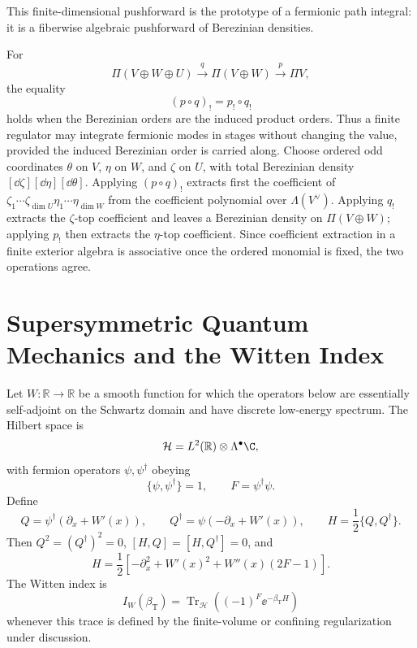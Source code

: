 This finite-dimensional pushforward is the prototype of a fermionic path
integral: it is a fiberwise algebraic pushforward of Berezinian densities.

For
\[
  \Pi(V\oplus W\oplus U)
  \xrightarrow{q}
  \Pi(V\oplus W)
  \xrightarrow{p}
  \Pi V ,
\]
the equality
\[
  (p\circ q)_!=p_!\circ q_!
\]
holds when the Berezinian orders are the induced product orders.  Thus a
finite regulator may integrate fermionic modes in stages without changing the
value, provided the induced Berezinian order is carried along.
Choose ordered odd coordinates \(\theta\) on \(V\), \(\eta\) on \(W\), and
\(\zeta\) on \(U\), with total Berezinian density
\([\dd\zeta][\dd\eta][\dd\theta]\).  Applying \((p\circ q)_!\) extracts first
the coefficient of \(\zeta_1\cdots\zeta_{\dim U}\eta_1\cdots\eta_{\dim W}\)
from the coefficient polynomial over \(\Lambda(V^\vee)\).  Applying \(q_!\)
extracts the \(\zeta\)-top coefficient and leaves a Berezinian density on
\(\Pi(V\oplus W)\); applying \(p_!\) then extracts the \(\eta\)-top
coefficient.  Since coefficient extraction in a finite exterior algebra is
associative once the ordered monomial is fixed, the two operations agree.

\section{Supersymmetric Quantum Mechanics and the Witten Index}

\begin{definition}
\label{def:susy-qm-witten-index-datum}
Let \(W:\mathbb R\to\mathbb R\) be a smooth function for which the operators
below are essentially self-adjoint on the Schwartz domain and have discrete
low-energy spectrum.  The Hilbert space is
\[
  \mathcal H=L^2(\mathbb R)\otimes\Lambda^\bullet\C,
\]
with fermion operators \(\psi,\psi^\dagger\) obeying
\[
  \{\psi,\psi^\dagger\}=1,\qquad
  F=\psi^\dagger\psi .
\]
Define
\[
  Q=\psi^\dagger(\partial_x+W'(x)),
  \qquad
  Q^\dagger=\psi(-\partial_x+W'(x)),
  \qquad
  H=\frac12\{Q,Q^\dagger\}.
\]
Then \(Q^2=(Q^\dagger)^2=0\), \([H,Q]=[H,Q^\dagger]=0\), and
\begin{equation}
  H
  =
  \frac12
  \left[
    -\partial_x^2+W'(x)^2+W''(x)(2F-1)
  \right].
  \label{eq:susy-qm-hamiltonian}
\end{equation}
The Witten index is
\[
  I_W(\beta_{\mathrm T})
  =
  \operatorname{Tr}_{\mathcal H}
  \left((-1)^F\ee^{-\beta_{\mathrm T}H}\right)
\]
whenever this trace is defined by the finite-volume or confining
regularization under discussion.
\end{definition}

